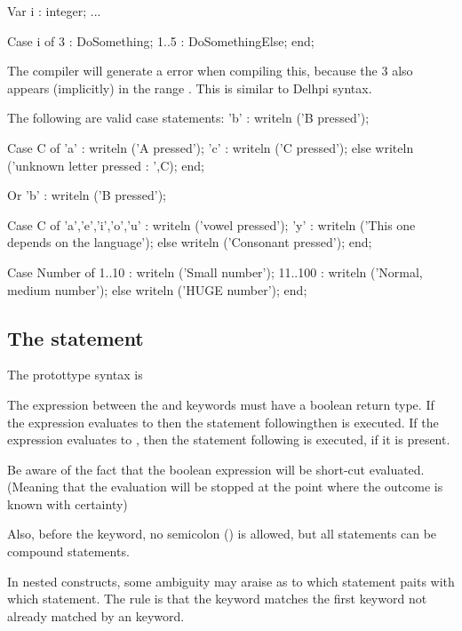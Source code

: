 \documentclass{report}
\begin{document}
\begin{listing}
Var i : integer;
...

Case i of
 3 : DoSomething;
 1..5 : DoSomethingElse;
end;
\end{listing}
The compiler will generate a  error when compiling
this, because the 3 also appears (implicitly) in the range . This
is similar to Delhpi syntax.

The following are valid case statements:
 'b' : writeln ('B pressed');
\begin{listing}
Case C of 
 'a' : writeln ('A pressed');
 'c' : writeln ('C pressed');
else
  writeln ('unknown letter pressed : ',C);
end;
\end{listing}
Or 
 'b' : writeln ('B pressed');
\begin{listing}
Case C of 
 'a','e','i','o','u' : writeln ('vowel pressed');
 'y' : writeln ('This one depends on the language');
else
  writeln ('Consonant pressed');
end;
\end{listing}
\begin{listing}
Case Number of 
 1..10   : writeln ('Small number');
 11..100 : writeln ('Normal, medium number');
else
 writeln ('HUGE number');
end;
\end{listing}

\subsection{The  statement}
The  protottype syntax is



The expression between the  and  keywords must have a
boolean return type. If the expression evaluates to  then the 
statement following{then} is executed. If the expression evaluates to 
, then the statement following  is executed, if it is
present.

Be aware of the fact that the boolean expression will be short-cut evaluated. 
(Meaning that the evaluation will be stopped at the point where the
 outcome is known with certainty)

Also, before the  keyword,  no semicolon (\var{;}) is allowed,
but all statements can be compound statements.

In nested  constructs, some ambiguity may araise as
to which   statement paits with which  statement. The rule
is that the  keyword matches the first  keyword not
already matched by an  keyword.
\end{document}
